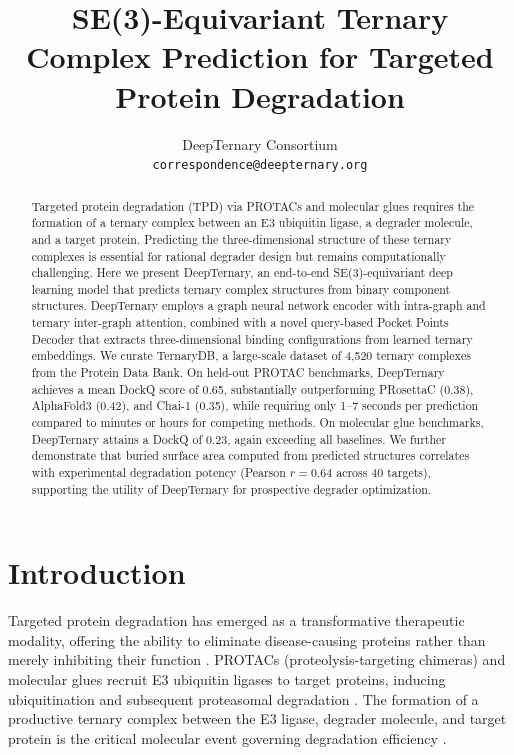 \documentclass[11pt]{article}
\title{SE(3)-Equivariant Ternary Complex Prediction for Targeted Protein Degradation}
\author{%
  DeepTernary Consortium\\
  \texttt{correspondence@deepternary.org}
}
\date{}
\begin{document}
\maketitle

\begin{abstract}
Targeted protein degradation (TPD) via PROTACs and molecular glues requires the formation of a ternary complex between an E3 ubiquitin ligase, a degrader molecule, and a target protein. Predicting the three-dimensional structure of these ternary complexes is essential for rational degrader design but remains computationally challenging. Here we present DeepTernary, an end-to-end SE(3)-equivariant deep learning model that predicts ternary complex structures from binary component structures. DeepTernary employs a graph neural network encoder with intra-graph and ternary inter-graph attention, combined with a novel query-based Pocket Points Decoder that extracts three-dimensional binding configurations from learned ternary embeddings. We curate TernaryDB, a large-scale dataset of 4,520 ternary complexes from the Protein Data Bank. On held-out PROTAC benchmarks, DeepTernary achieves a mean DockQ score of 0.65, substantially outperforming PRosettaC (0.38), AlphaFold3 (0.42), and Chai-1 (0.35), while requiring only 1--7 seconds per prediction compared to minutes or hours for competing methods. On molecular glue benchmarks, DeepTernary attains a DockQ of 0.23, again exceeding all baselines. We further demonstrate that buried surface area computed from predicted structures correlates with experimental degradation potency (Pearson $r = 0.64$ across 40 targets), supporting the utility of DeepTernary for prospective degrader optimization.
\end{abstract}

\section{Introduction}

Targeted protein degradation has emerged as a transformative therapeutic modality, offering the ability to eliminate disease-causing proteins rather than merely inhibiting their function \citep{sakamoto2001,lai2017}. PROTACs (proteolysis-targeting chimeras) and molecular glues recruit E3 ubiquitin ligases to target proteins, inducing ubiquitination and subsequent proteasomal degradation \citep{pettersson2019}. The formation of a productive ternary complex between the E3 ligase, degrader molecule, and target protein is the critical molecular event governing degradation efficiency \citep{gadd2017}.
\end{document}
